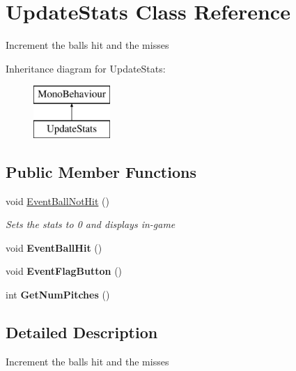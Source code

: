 \hypertarget{class_update_stats}{}\section{Update\+Stats Class Reference}
\label{class_update_stats}


Increment the balls hit and the misses  


Inheritance diagram for Update\+Stats\+:\begin{figure}[H]
\begin{center}
\leavevmode
\includegraphics[height=2.000000cm]{class_update_stats}
\end{center}
\end{figure}
\subsection*{Public Member Functions}
\begin{DoxyCompactItemize}
\item 
void \hyperlink{class_update_stats_a87cdd8689a5361dd769cecc74fa32b01}{Event\+Ball\+Not\+Hit} ()
\begin{DoxyCompactList}\small\item\em Sets the stats to 0 and displays in-\/game \end{DoxyCompactList}\item 
void {\bfseries Event\+Ball\+Hit} ()\hypertarget{class_update_stats_ae60df3dfd6b5887c1fef382bb76a3d4c}{}\label{class_update_stats_ae60df3dfd6b5887c1fef382bb76a3d4c}

\item 
void {\bfseries Event\+Flag\+Button} ()\hypertarget{class_update_stats_a648076074f3a37edffd63583ab319ad7}{}\label{class_update_stats_a648076074f3a37edffd63583ab319ad7}

\item 
int {\bfseries Get\+Num\+Pitches} ()\hypertarget{class_update_stats_ad1a620ba0e77969a584a2afcddb11dae}{}\label{class_update_stats_ad1a620ba0e77969a584a2afcddb11dae}

\end{DoxyCompactItemize}


\subsection{Detailed Description}
Increment the balls hit and the misses 



